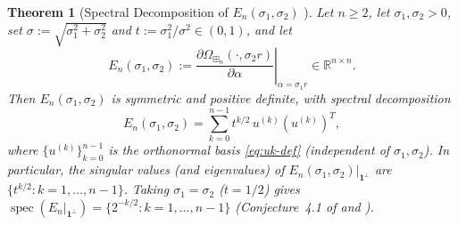 \documentclass[11pt,a4paper]{article}
\newtheorem{theorem}{Theorem}[section]
\theoremstyle{definition}
\DeclareMathOperator{\spec}{spec}
\newcommand{\R}{\mathbb{R}}
\newcommand{\boxplusn}{\boxplus_n}
\newcommand{\one}{\mathbf{1}}
\begin{document}
\begin{theorem}[Spectral Decomposition of $E_n(\sigma_1, \sigma_2)$ {\cite[Theorem~A.1]{HH2026}}]
\label{thm:spectrum}
Let $n \ge 2$, let $\sigma_1, \sigma_2 > 0$, set $\sigma := \sqrt{\sigma_1^2 + \sigma_2^2}$ and $t := \sigma_1^2 / \sigma^2 \in (0,1)$, and let
\[
E_n(\sigma_1, \sigma_2) := \left.\frac{\partial \Omega_{\boxplusn}(\cdot, \sigma_2 r)}{\partial \alpha}\right|_{\alpha = \sigma_1 r} \in \R^{n \times n}.
\]
Then $E_n(\sigma_1, \sigma_2)$ is symmetric and positive definite, with spectral decomposition
\begin{equation}
\label{eq:spectral-decomp}
E_n(\sigma_1, \sigma_2) = \sum_{k=0}^{n-1} t^{k/2}\, u^{(k)} (u^{(k)})^T,
\end{equation}
where $\{u^{(k)}\}_{k=0}^{n-1}$ is the orthonormal basis \eqref{eq:uk-def} (independent of $\sigma_1, \sigma_2$). In particular, the singular values (and eigenvalues) of $E_n(\sigma_1, \sigma_2)|_{\one^\perp}$ are $\{t^{k/2} : k = 1,\dots,n-1\}$. Taking $\sigma_1 = \sigma_2$ ($t = 1/2$) gives $\spec(E_n|_{\one^\perp}) = \{2^{-k/2} : k = 1,\dots,n-1\}$ (Conjecture~4.1 of \cite{Hashemi2026} and \cite[Theorem~A.1]{HH2026}).
\end{theorem}
\end{document}
